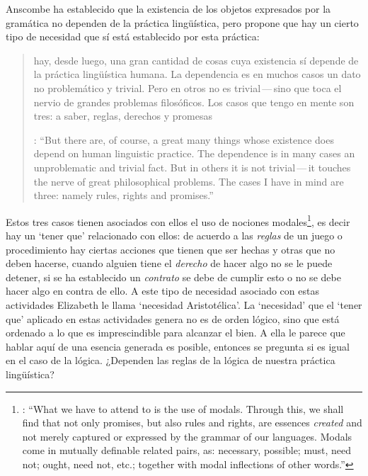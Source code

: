 Anscombe ha establecido que la existencia de los objetos expresados por la gramática no dependen de la práctica lingüística, pero propone que hay un cierto tipo de necesidad que sí está establecido por esta práctica: \blockquote[{\cite[118]{anscombe1981parmenides:qli}}: \enquote{But there are, of course, a great many things whose existence does depend on human linguistic practice. The dependence is in many cases an unproblematic and trivial fact. But in others it is not trivial\,---\,it touches the nerve of great philosophical problems. The cases I have in mind are three: namely rules, rights and promises.}]{hay, desde luego, una gran cantidad de cosas cuya existencia sí depende de la práctica lingüística humana. La dependencia es en muchos casos un dato no problemático y trivial. Pero en otros no es trivial\,---\,sino que toca el nervio de grandes problemas filosóficos. Los casos que tengo en mente son tres: a saber, reglas, derechos y promesas}. Estos tres casos tienen asociados con ellos el uso de nociones modales\footnote{\cite[Cf.~][100]{anscombe1981erp:rrp}: \enquote{What we have to attend to is the use of modals. Through this, we shall find that not only promises, but also rules and rights, are essences \emph{created} and not merely captured or expressed by the grammar of our languages. Modals come in mutually definable related pairs, as: necessary, possible; must, need not; ought, need not, etc.; together with modal inflections of other words.}}, es decir hay un `tener que' relacionado con ellos: de acuerdo a las \emph{reglas} de un juego o procedimiento hay ciertas acciones que tienen que ser hechas y otras que no deben hacerse, cuando alguien tiene el \emph{derecho} de hacer algo no se le puede detener, si se ha establecido un \emph{contrato} se debe de cumplir esto o no se debe hacer algo en contra de ello. A este tipo de necesidad asociado con estas actividades Elizabeth le llama `necesidad Aristotélica'. La `necesidad' que el `tener que' aplicado en estas actividades genera no es de orden lógico, sino que está ordenado a lo que es imprescindible para alcanzar el bien. A ella le parece que hablar aquí de una esencia generada es posible, entonces se pregunta si es igual en el caso de la lógica. ¿Dependen las reglas de la lógica de nuestra práctica lingüística?

